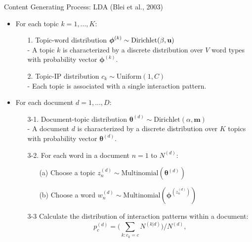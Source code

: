 \documentclass[10pt]{beamer}
\def\bni{\begin{itemize}} \def\ei{\end{itemize}}
\theoremstyle{definition}
\theoremstyle{remark}
\begin{document}
\begin{frame}{Content Generating Process: LDA (Blei et al., 2003)}
\bni 
\item For each topic $k =1,...,K:$\vspace{0.2cm}
	\begin{itemize}
		\item[1.] Topic-word distribution {$\boldsymbol{\phi}^{(k)} \sim \mbox{Dirichlet}(\beta, \bf u)$}\\
		- A topic $k$ is characterized by a discrete distribution over $V$ word types with probability vector $\boldsymbol{\phi}^{(k)}$. \vspace{0.2cm}
		\item[2.] Topic-IP distribution $c_k\sim \mbox{Uniform}(1, C)$\\
		- Each topic is associated with a single interaction pattern.			
		\end{itemize}\vspace{0.4cm}
\item For each document $d =1,...,D:$ \vspace{0.2cm}
	\begin{itemize}
\item[3-1.] Document-topic distribution $\boldsymbol{\theta}^{(d)}\sim \mbox{Dirichlet}(\alpha, \boldsymbol{m})$\\
- A document $d$ is characterized by a discrete distribution over $K$ topics with probability vector $\boldsymbol{\theta}^{(d)}$. \vspace{0.2cm}
		\item[3-2.] For each word in a document $n=1$ to $N^{(d)}$:
		\begin{itemize}
			\item[(a)] Choose a topic $z_n^{(d)} \sim \mbox{Multinomial}(\boldsymbol{\theta}^{(d)})$
			\item[(b)] Choose a word $w_n^{(d)} \sim\mbox{Multinomial} (\boldsymbol{\phi}^{(z_n^{(d)})})$
		\end{itemize} \vspace{0.2cm}
		\item[3-3] Calculate the distribution of interaction patterns within a document:
		 \footnotesize\begin{equation}
		p_c^{(d)} = \Big({\sum\limits_{k: c_k=c} N^{(k|d)}}\Big)/{N^{(d)}},
		\end{equation}\normalsize
	\end{itemize}
\ei	
\end{frame}
\end{document}
